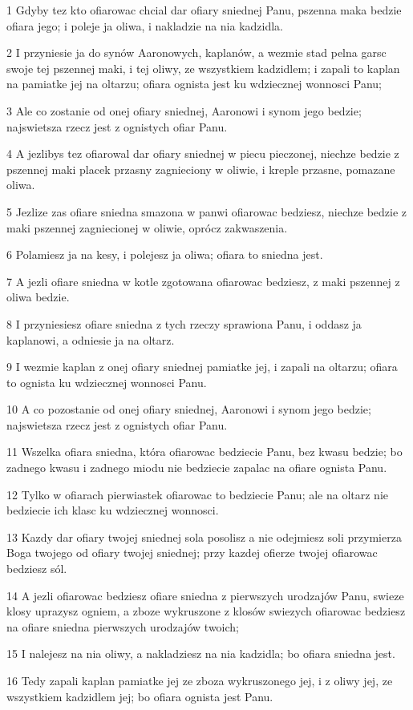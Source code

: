 \par 1 Gdyby tez kto ofiarowac chcial dar ofiary sniednej Panu, pszenna maka bedzie ofiara jego; i poleje ja oliwa, i nakladzie na nia kadzidla.
\par 2 I przyniesie ja do synów Aaronowych, kaplanów, a wezmie stad pelna garsc swoje tej pszennej maki, i tej oliwy, ze wszystkiem kadzidlem; i zapali to kaplan na pamiatke jej na oltarzu; ofiara ognista jest ku wdziecznej wonnosci Panu;
\par 3 Ale co zostanie od onej ofiary sniednej, Aaronowi i synom jego bedzie; najswietsza rzecz jest z ognistych ofiar Panu.
\par 4 A jezlibys tez ofiarowal dar ofiary sniednej w piecu pieczonej, niechze bedzie z pszennej maki placek przasny zagnieciony w oliwie, i kreple przasne, pomazane oliwa.
\par 5 Jezlize zas ofiare sniedna smazona w panwi ofiarowac bedziesz, niechze bedzie z maki pszennej zagniecionej w oliwie, oprócz zakwaszenia.
\par 6 Polamiesz ja na kesy, i polejesz ja oliwa; ofiara to sniedna jest.
\par 7 A jezli ofiare sniedna w kotle zgotowana ofiarowac bedziesz, z maki pszennej z oliwa bedzie.
\par 8 I przyniesiesz ofiare sniedna z tych rzeczy sprawiona Panu, i oddasz ja kaplanowi, a odniesie ja na oltarz.
\par 9 I wezmie kaplan z onej ofiary sniednej pamiatke jej, i zapali na oltarzu; ofiara to ognista ku wdziecznej wonnosci Panu.
\par 10 A co pozostanie od onej ofiary sniednej, Aaronowi i synom jego bedzie; najswietsza rzecz jest z ognistych ofiar Panu.
\par 11 Wszelka ofiara sniedna, która ofiarowac bedziecie Panu, bez kwasu bedzie; bo zadnego kwasu i zadnego miodu nie bedziecie zapalac na ofiare ognista Panu.
\par 12 Tylko w ofiarach pierwiastek ofiarowac to bedziecie Panu; ale na oltarz nie bedziecie ich klasc ku wdziecznej wonnosci.
\par 13 Kazdy dar ofiary twojej sniednej sola posolisz a nie odejmiesz soli przymierza Boga twojego od ofiary twojej sniednej; przy kazdej ofierze twojej ofiarowac bedziesz sól.
\par 14 A jezli ofiarowac bedziesz ofiare sniedna z pierwszych urodzajów Panu, swieze klosy uprazysz ogniem, a zboze wykruszone z klosów swiezych ofiarowac bedziesz na ofiare sniedna pierwszych urodzajów twoich;
\par 15 I nalejesz na nia oliwy, a nakladziesz na nia kadzidla; bo ofiara sniedna jest.
\par 16 Tedy zapali kaplan pamiatke jej ze zboza wykruszonego jej, i z oliwy jej, ze wszystkiem kadzidlem jej; bo ofiara ognista jest Panu.

